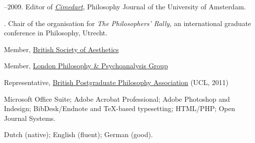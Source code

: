 \documentclass[11pt]{article}
\begin{document}
--2009. Editor of \href{http://www.cimedart.nl}{\emph{Cimedart}}, Philosophy Journal of the University of Amsterdam.

. Chair of the organisation for \emph{The Philosophers' Rally,} an international graduate conference in Philosophy, Utrecht.

\bigskip 


\ind Member, \href{http://www.philosophy-psychoanalysis.org.uk}{British Society of Aesthetics}

\ind Member, \href{http://www.philosophy-psychoanalysis.org.uk}{London Philosophy \& Psychoanalysis Group}

\ind Representative, \href{http://www.bppa-online.org}{British Postgraduate Philosophy Association} (UCL, 2011)

\bigskip

\medskip

\ind Microsoft Office Suite; Adobe Acrobat Professional; Adobe Photoshop and Indesign; BibDesk/Endnote and TeX-based typesetting; HTML/PHP; Open Journal Systems.

\bigskip 

\medskip

\ind Dutch (native); English (fluent); German (good).

\rfoot{\footnotesize{\today}}
\end{document}
